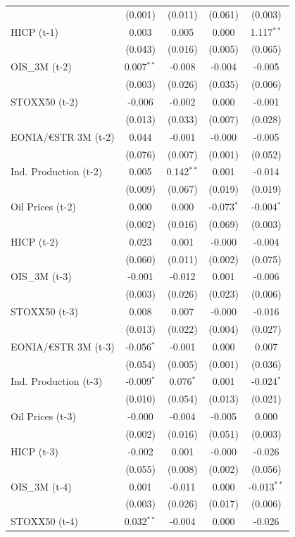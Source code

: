 \begin{longtable}[t]{lcccc}
 & (0.001) & (0.011) & (0.061) & (0.003)\\
HICP (t-1) & 0.003 & 0.005 & 0.000 & 1.117$^{**}$\\
 & (0.043) & (0.016) & (0.005) & (0.065)\\
OIS\_3M (t-2) & 0.007$^{**}$ & -0.008 & -0.004 & -0.005\\
 & (0.003) & (0.026) & (0.035) & (0.006)\\
STOXX50 (t-2) & -0.006 & -0.002 & 0.000 & -0.001\\
 & (0.013) & (0.033) & (0.007) & (0.028)\\
EONIA/€STR 3M (t-2) & 0.044 & -0.001 & -0.000 & -0.005\\
 & (0.076) & (0.007) & (0.001) & (0.052)\\
Ind. Production (t-2) & 0.005 & 0.142$^{**}$ & 0.001 & -0.014\\
 & (0.009) & (0.067) & (0.019) & (0.019)\\
Oil Prices (t-2) & 0.000 & 0.000 & -0.073$^{*}$ & -0.004$^{*}$\\
 & (0.002) & (0.016) & (0.069) & (0.003)\\
HICP (t-2) & 0.023 & 0.001 & -0.000 & -0.004\\
 & (0.060) & (0.011) & (0.002) & (0.075)\\
OIS\_3M (t-3) & -0.001 & -0.012 & 0.001 & -0.006\\
 & (0.003) & (0.026) & (0.023) & (0.006)\\
STOXX50 (t-3) & 0.008 & 0.007 & -0.000 & -0.016\\
 & (0.013) & (0.022) & (0.004) & (0.027)\\
EONIA/€STR 3M (t-3) & -0.056$^{*}$ & -0.001 & 0.000 & 0.007\\
 & (0.054) & (0.005) & (0.001) & (0.036)\\
Ind. Production (t-3) & -0.009$^{*}$ & 0.076$^{*}$ & 0.001 & -0.024$^{*}$\\
 & (0.010) & (0.054) & (0.013) & (0.021)\\
Oil Prices (t-3) & -0.000 & -0.004 & -0.005 & 0.000\\
 & (0.002) & (0.016) & (0.051) & (0.003)\\
HICP (t-3) & -0.002 & 0.001 & -0.000 & -0.026\\
 & (0.055) & (0.008) & (0.002) & (0.056)\\
OIS\_3M (t-4) & 0.001 & -0.011 & 0.000 & -0.013$^{**}$\\
 & (0.003) & (0.026) & (0.017) & (0.006)\\
STOXX50 (t-4) & 0.032$^{**}$ & -0.004 & 0.000 & -0.026\\

\end{longtable}
